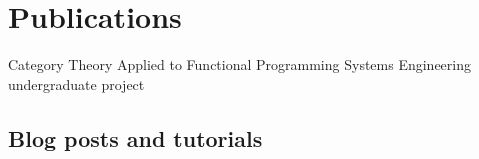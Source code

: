\documentclass[12pt,letterpaper,sans]{moderncv}
\begin{document}
\section{Publications}

  {Category Theory Applied to Functional Programming}
  {Systems Engineering undergraduate project}
  {}
  {}
  {
  }

\subsection{Blog posts and tutorials}
\end{document}

